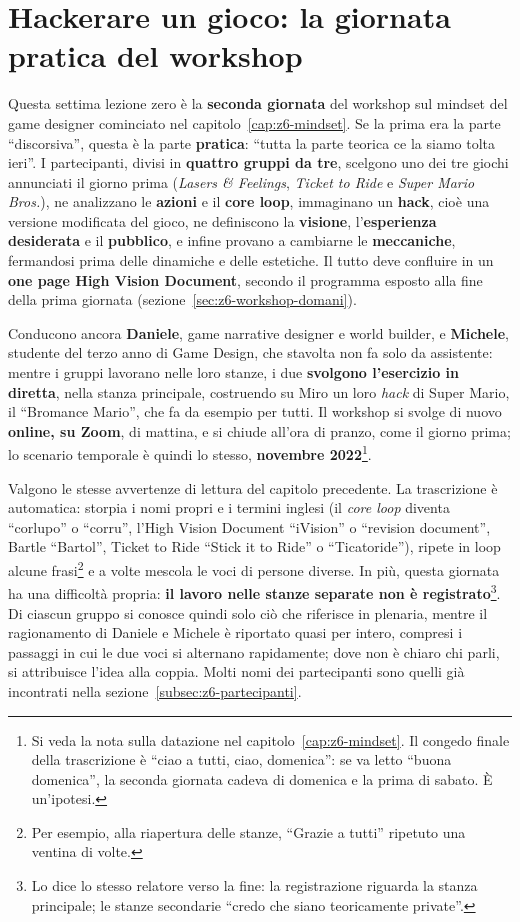 \chapter[Hackerare un gioco]{Hackerare un gioco: la giornata pratica del
workshop}
\label{z7:cap:hack}

Questa settima lezione zero è la \textbf{seconda giornata} del workshop sul
mindset del game designer cominciato nel capitolo~\ref{cap:z6-mindset}. Se la
prima era la parte ``discorsiva'', questa è la parte \textbf{pratica}: ``tutta
la parte teorica ce la siamo tolta ieri''. I partecipanti, divisi in
\textbf{quattro gruppi da tre}, scelgono uno dei tre giochi annunciati il giorno
prima (\emph{Lasers \& Feelings}, \emph{Ticket to Ride} e \emph{Super Mario
Bros.}), ne analizzano le \textbf{azioni} e il \textbf{core loop}, immaginano
un \textbf{hack}, cioè una versione modificata del gioco, ne definiscono la
\textbf{visione}, l'\textbf{esperienza desiderata} e il \textbf{pubblico}, e
infine provano a cambiarne le \textbf{meccaniche}, fermandosi prima delle
dinamiche e delle estetiche. Il tutto deve confluire in un \textbf{one page
High Vision Document}, secondo il programma esposto alla fine della prima
giornata (sezione~\ref{sec:z6-workshop-domani}).

Conducono ancora \textbf{Daniele}, game narrative designer e world builder, e
\textbf{Michele}, studente del terzo anno di Game Design, che stavolta non fa
solo da assistente: mentre i gruppi lavorano nelle loro stanze, i due
\textbf{svolgono l'esercizio in diretta}, nella stanza principale, costruendo
su Miro un loro \emph{hack} di Super Mario, il ``Bromance Mario'', che fa da
esempio per tutti. Il workshop si svolge di nuovo \textbf{online, su Zoom},
di mattina, e si chiude all'ora di pranzo, come il giorno prima; lo scenario
temporale è quindi lo stesso, \textbf{novembre 2022}\footnote{Si veda la nota
sulla datazione nel capitolo~\ref{cap:z6-mindset}. Il congedo finale della
trascrizione è ``ciao a tutti, ciao, domenica'': se va letto ``buona
domenica'', la seconda giornata cadeva di domenica e la prima di sabato. È
un'ipotesi.}.

Valgono le stesse avvertenze di lettura del capitolo precedente. La trascrizione
è automatica: storpia i nomi propri e i termini inglesi (il \emph{core loop}
diventa ``corlupo'' o ``corru'', l'High Vision Document ``iVision'' o
``revision document'', Bartle ``Bartol'', Ticket to Ride ``Stick it to Ride'' o
``Ticatoride''), ripete in loop alcune frasi\footnote{Per esempio, alla
riapertura delle stanze, ``Grazie a tutti'' ripetuto una ventina di volte.} e a
volte mescola le voci di persone diverse. In più, questa giornata ha una
difficoltà propria: \textbf{il lavoro nelle stanze separate non è
registrato}\footnote{Lo dice lo stesso relatore verso la fine: la registrazione
riguarda la stanza principale; le stanze secondarie ``credo che siano
teoricamente private''.}. Di ciascun gruppo si conosce quindi solo ciò che
riferisce in plenaria, mentre il ragionamento di Daniele e Michele è riportato
quasi per intero, compresi i passaggi in cui le due voci si alternano
rapidamente; dove non è chiaro chi parli, si attribuisce l'idea alla coppia.
Molti nomi dei partecipanti sono quelli già incontrati nella
sezione~\ref{subsec:z6-partecipanti}.

